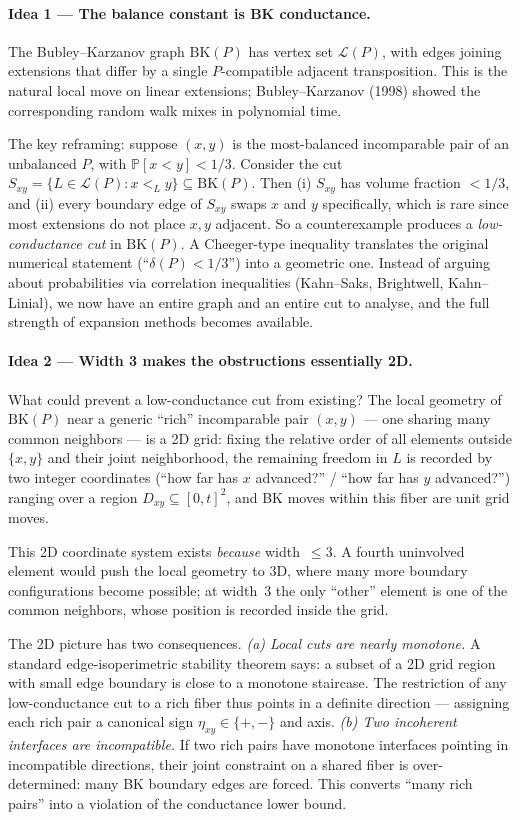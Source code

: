 \documentclass[11pt]{article}
\newcommand{\BK}{\mathrm{BK}}
\newcommand{\LP}{\mathcal{L}(P)}
\newcommand{\Pp}{\mathbb{P}}
\begin{document}
\paragraph{Idea 1 — The balance constant is BK conductance.}
The Bubley--Karzanov graph $\BK(P)$ has vertex set $\LP$, with edges
joining extensions that differ by a single $P$-compatible adjacent
transposition. This is the natural local move on linear extensions;
Bubley--Karzanov (1998) showed the corresponding random walk mixes in
polynomial time.

The key reframing: suppose $(x,y)$ is the most-balanced incomparable
pair of an unbalanced $P$, with $\Pp[x<y]<1/3$. Consider the cut
$ S_{xy} = \{L\in\LP : x<_L y\}\subseteq\BK(P).$
Then (i) $S_{xy}$ has volume fraction $<1/3$, and (ii) every boundary
edge of $S_{xy}$ swaps $x$ and $y$ specifically, which is rare since
most extensions do not place $x,y$ adjacent. So a counterexample
produces a \emph{low-conductance cut} in $\BK(P)$. A Cheeger-type
inequality translates the original numerical statement
(``$\delta(P)<1/3$'') into a geometric one. Instead of arguing
about probabilities via correlation inequalities (Kahn--Saks,
Brightwell, Kahn--Linial), we now have an entire graph and an entire
cut to analyse, and the full strength of expansion methods becomes
available.

\paragraph{Idea 2 — Width 3 makes the obstructions essentially 2D.}
What could prevent a low-conductance cut from existing? The local
geometry of $\BK(P)$ near a generic ``rich'' incomparable pair
$(x,y)$ --- one sharing many common neighbors --- is a 2D grid:
fixing the relative order of all elements outside $\{x,y\}$ and their
joint neighborhood, the remaining freedom in $L$ is recorded by two
integer coordinates (``how far has $x$ advanced?'' / ``how far has
$y$ advanced?'') ranging over a region $D_{xy}\subseteq[0,t]^2$, and
BK moves within this fiber are unit grid moves.

This 2D coordinate system exists \emph{because} width~$\le 3$. A
fourth uninvolved element would push the local geometry to 3D, where
many more boundary configurations become possible; at width~$3$ the
only ``other'' element is one of the common neighbors, whose position
is recorded inside the grid.

The 2D picture has two consequences. \emph{(a) Local cuts are nearly
monotone.} A standard edge-isoperimetric stability theorem says: a
subset of a 2D grid region with small edge boundary is close to a
monotone staircase. The restriction of any low-conductance cut to a
rich fiber thus points in a definite direction --- assigning each
rich pair a canonical sign $\eta_{xy}\in\{+,-\}$ and axis. \emph{(b)
Two incoherent interfaces are incompatible.} If two rich pairs have
monotone interfaces pointing in incompatible directions, their joint
constraint on a shared fiber is over-determined: many BK boundary
edges are forced. This converts ``many rich pairs'' into a violation
of the conductance lower bound.
\end{document}
